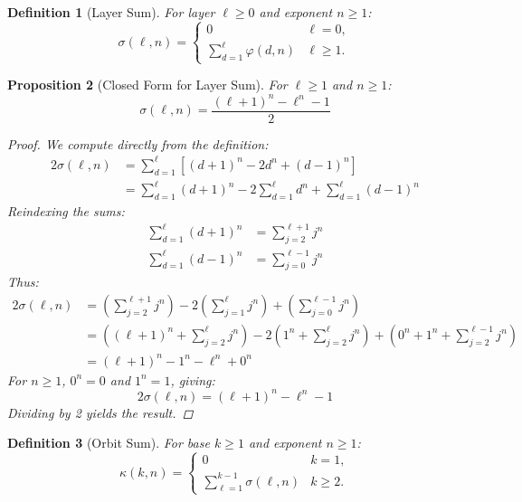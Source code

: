 \documentclass[11pt]{article}
\newtheorem{definition}{Definition}[section]
\newtheorem{proposition}[definition]{Proposition}
\begin{document}
\begin{definition}[Layer Sum]\label{def:layer-sum}
For layer $\ell \geq 0$ and exponent $n \geq 1$:
\[
\sigma(\ell,n) = \begin{cases}
    0 & \ell = 0, \\
    \sum_{d=1}^{\ell} \varphi(d,n) & \ell \geq 1.
\end{cases}
\]
\end{definition}

\begin{proposition}[Closed Form for Layer Sum]\label{prop:layer-sum-closed}
For $\ell \geq 1$ and $n \geq 1$:
\[
\sigma(\ell,n) = \frac{(\ell+1)^n - \ell^n - 1}{2}
\]
\begin{proof}
We compute directly from the definition:
\begin{align*}
2\sigma(\ell,n) &= \sum_{d=1}^{\ell} \left[(d+1)^{n} - 2d^{n} + (d-1)^{n}\right] \\
&= \sum_{d=1}^{\ell} (d+1)^{n} - 2\sum_{d=1}^{\ell} d^{n} + \sum_{d=1}^{\ell} (d-1)^{n}
\end{align*}
Reindexing the sums:
\begin{align*}
\sum_{d=1}^{\ell} (d+1)^{n} &= \sum_{j=2}^{\ell+1} j^{n} \\
\sum_{d=1}^{\ell} (d-1)^{n} &= \sum_{j=0}^{\ell-1} j^{n}
\end{align*}
Thus:
\begin{align*}
2\sigma(\ell,n) &= \left(\sum_{j=2}^{\ell+1} j^{n}\right) - 2\left(\sum_{j=1}^{\ell} j^{n}\right) + \left(\sum_{j=0}^{\ell-1} j^{n}\right) \\
&= \left((\ell+1)^{n} + \sum_{j=2}^{\ell} j^{n}\right) - 2\left(1^{n} + \sum_{j=2}^{\ell} j^{n}\right) + \left(0^{n} + 1^{n} + \sum_{j=2}^{\ell-1} j^{n}\right) \\
&= (\ell+1)^{n} - 1^{n} - \ell^{n} + 0^{n}
\end{align*}
For $n \geq 1$, $0^{n} = 0$ and $1^{n} = 1$, giving:
\[
2\sigma(\ell,n) = (\ell+1)^{n} - \ell^{n} - 1
\]
Dividing by 2 yields the result.
\end{proof}
\end{proposition}

\begin{definition}[Orbit Sum]\label{def:orbit-sum}
For base $k \geq 1$ and exponent $n \geq 1$:
\[
\kappa(k,n) = \begin{cases}
    0 & k = 1, \\
    \sum_{\ell=1}^{k-1} \sigma(\ell,n) & k \geq 2.
\end{cases}
\]
\end{definition}
\end{document}
